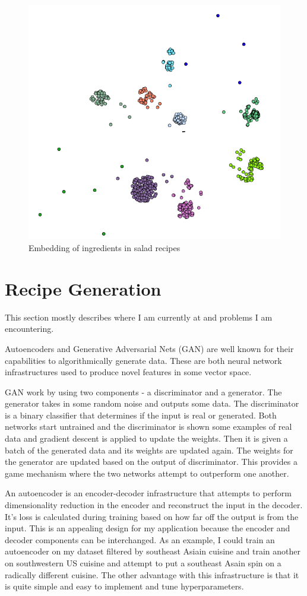 \documentclass[conference]{IEEEtran}
\begin{document}
  \begin{figure}[h!]
	\centering
	\includegraphics[width=0.8\linewidth]{salads.png}
	\caption[Embedding of ingredients in salad recipes]{Embedding of ingredients in salad recipes}
	\label{fig:P2compileP0-1}
  \end{figure}

\section{Recipe Generation}
This section mostly describes where I am currently at and problems I am encountering.

Autoencoders \cite{Makhzani16} and Generative Adversarial Nets (GAN) \cite{Goodfellow14} are well known for their capabilities
to algorithmically generate data. These are both neural network infrastructures used to produce
novel features in some vector space.

GAN work by using two components - a discriminator and
a generator. The generator takes in some random noise and outputs some data. The discriminator
is a binary classifier that determines if the input is real or generated. Both networks start
untrained and the discriminator is shown some examples of real data and gradient descent is
applied to update the weights. Then it is given a batch of the generated data and its weights
are updated again. The weights for the generator are updated based on the output of discriminator.
This provides a game mechanism where the two networks attempt to outperform one another.

An autoencoder is an encoder-decoder infrastructure that attempts to perform dimensionality
reduction in the encoder and reconstruct the input in the decoder. It's loss is calculated
during training based on how far off the output is from the input. This is an appealing design
for my application because the encoder and decoder components can be interchanged. As an example,
I could train an autoencoder on my dataset filtered by southeast Asiain cuisine and train another
on southwestern US cuisine and attempt to put a southeast Asain spin on a radically different
cuisine. The other advantage with this infrastructure is that it is quite simple and easy to
implement and tune hyperparameters.
\end{document}
